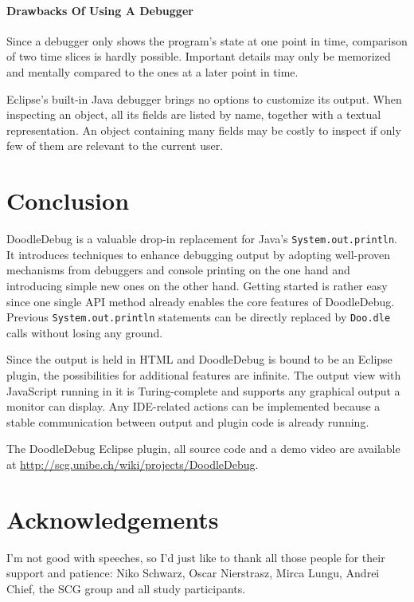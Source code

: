 \documentclass[english]{scrartcl}
\newcommand{\DD}{Dood\-le\-De\-bug\xspace}
\newcommand{\Doodle}{\texttt{Doo.\-dle}\xspace}
\newcommand{\println}{\texttt{Sys\-tem.\-out.\-println}\xspace}
\begin{document}
\paragraph{Drawbacks Of Using A Debugger}
Since a debugger only shows the program's state at one point in time, comparison of two time slices is hardly possible.
Important details may only be memorized and mentally compared to the ones at a later point in time.

Eclipse's built-in Java debugger brings no options to customize its output.
When inspecting an object, all its fields are listed by name, together with a textual representation.
An object containing many fields may be costly to inspect if only few of them are relevant to the current user.


\section{Conclusion}
\DD is a valuable drop-in replacement for Java's \println.
It introduces techniques to enhance debugging output by adopting well-proven mechanisms from debuggers and console printing on the one hand and introducing simple new ones on the other hand.
Getting started is rather easy since one single API method already enables the core features of \DD.
Previous \println statements can be directly replaced by \Doodle calls without losing any ground.

Since the output is held in HTML and \DD is bound to be an Eclipse plugin, the possibilities for additional features are infinite.
The output view with JavaScript running in it is Turing-complete and supports any graphical output a monitor can display.
Any IDE-related actions can be implemented because a stable communication between output and plugin code is already running.

The DoodleDebug Eclipse plugin, all source code and a demo video are available at \url{http://scg.unibe.ch/wiki/projects/DoodleDebug}.

\section{Acknowledgements}
I'm not good with speeches, so I'd just like to thank all those people for their support and patience: Niko Schwarz, Oscar Nierstrasz, Mirca Lungu, Andrei Chief, the SCG group and all study participants.



{}
\end{document}
